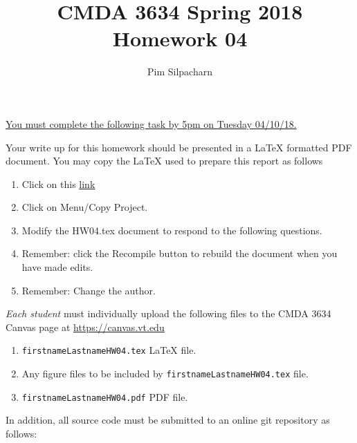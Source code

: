 \documentclass{article}
\newcommand{\pad}{\vspace{8pt}\noindent}
\newcommand{\myhref}[2]{\href{#1}{\color{foo}\underline{#2}\color{black}}}
\begin{document}
\title{CMDA 3634 Spring 2018 Homework 04}

\author{Pim Silpacharn}
\vspace{-64pt}\maketitle
\begin{center}\underline{You must complete the following task by 5pm on Tuesday 04/10/18.}\end{center}
Your write up for this homework should be presented in a {\LaTeX} formatted PDF document. You may copy the \LaTeX{} used to prepare this report as follows

\begin{enumerate}
\item Click on this  \myhref{https://www.sharelatex.com/read/twcrgdqfcvvr}{link} 
\item Click on Menu/Copy Project.
\item Modify the HW04.tex document to respond to the following questions. 
\item Remember: click the Recompile button to rebuild the document when you have made edits.
\item Remember: Change the author. 

\end{enumerate}

\pad \emph{Each student} must individually upload the following files to the CMDA 3634 Canvas page at \myhref{https://canvas.vt.edu}{https://canvas.vt.edu}

\begin{enumerate}
\item \verb|firstnameLastnameHW04.tex| {\LaTeX} file.
\item Any figure files to be included by \verb|firstnameLastnameHW04.tex| file.
\item \verb|firstnameLastnameHW04.pdf| PDF file.
\end{enumerate}

\noindent In addition, all source code must be submitted to an online git repository as follows:
\end{document}
